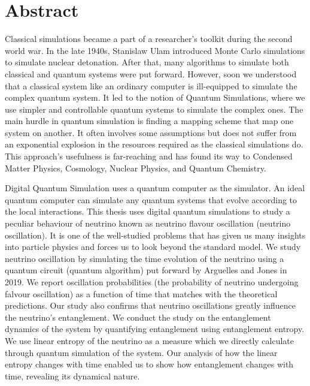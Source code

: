 \documentclass[12pt,a4paper]{report}
\begin{document}
\chapter*{Abstract}\vspace{-3em}
Classical simulations became a part of a researcher's toolkit during the second world war. In the late 1940s, Stanislaw Ulam introduced Monte Carlo simulations to simulate nuclear detonation. After that, many algorithms to simulate both classical and quantum systems were put forward. However, soon we understood that a classical system like an ordinary computer is ill-equipped to simulate the complex quantum system. It led to the notion of Quantum Simulations, where we use simpler and controllable quantum systems to simulate the complex ones. The main hurdle in quantum simulation is finding a mapping scheme that map one system on another. It often involves some assumptions but does not suffer from an exponential explosion in the resources required as the classical simulations do. This approach's usefulness is far-reaching and has found its way to Condensed Matter Physics, Cosmology, Nuclear Physics, and Quantum Chemistry. \par
Digital Quantum Simulation uses a quantum computer as the simulator. An ideal quantum computer can simulate any quantum systems that evolve according to the local interactions. This thesis uses digital quantum simulations to study a peculiar behaviour of neutrino known as neutrino flavour oscillation (neutrino oscillation). It is one of the well-studied problems that has given us many insights into particle physics and forces us to look beyond the standard model. We study neutrino oscillation by simulating the time evolution of the neutrino using a quantum circuit (quantum algorithm) put forward by Arguelles and Jones in 2019. We report oscillation probabilities (the probability of neutrino undergoing falvour oscillation) as a function of time that matches with the theoretical predictions. Our study also confirms that neutrino oscillations greatly influence the neutrino's entanglement. We conduct the study on the entanglement dynamics of the system by quantifying entanglement using entanglement entropy. We use linear entropy of the neutrino as a measure which we directly calculate through quantum simulation of the system. Our analysis of how the linear entropy changes with time enabled us to show how entanglement changes with time, revealing its dynamical nature.


\newpage
\pagebreak	
{
	\hypersetup{linkcolor=black}
	\tableofcontents
	\listoffigures
}
\end{document}
